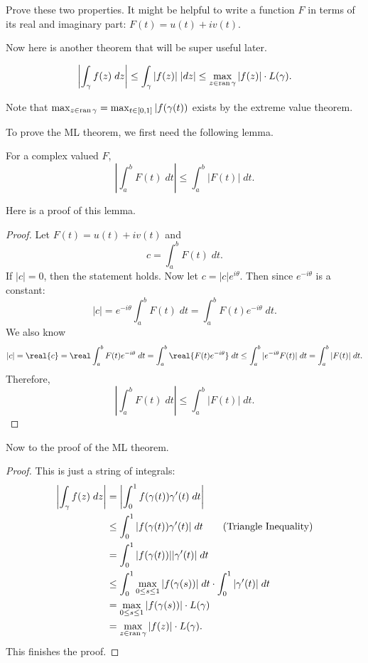 \documentclass[notes]{subfile}
\begin{document}
\begin{exercise}
    Prove these two properties.
    It might be helpful to write a function $F$ in terms of
    its real and imaginary part: $F(t) = u(t) + iv(t)$.
\end{exercise}

Now here is another theorem that will be super useful later.
\begin{theorem}[ML Theorem]
    \[ \left| \int_{\gamma} f(z) \; dz \right| \le
        \int_{\gamma} |f(z)| \; |dz| \le
    \max_{z \in \operatorname{ran}{\gamma}} |f(z)| \cdot L(\gamma). \]
\end{theorem}

Note that $\max_{z \in \operatorname{ran}{\gamma}} = \max_{t \in [0,1]} |f(\gamma(t))$ exists by the extreme value theorem. 

To prove the ML theorem, we first need the following lemma.
\begin{lemma}
    For a complex valued $F$,
    \[ \left| \int_a^b F(t) \; dt \right| \le 
    \int_a^b |F(t)| \; dt. \]
\end{lemma}

Here is a proof of this lemma.
\begin{proof}
    Let $F(t) = u(t) + iv(t)$ and
    \[ c = \int_a^b F(t) \; dt. \]
    If $|c| = 0$, then the statement holds.
    Now let $c = |c| e^{i\theta}$.
    Then since $e^{-i\theta}$ is a constant:
    \[ |c| = e^{-i\theta} \int_a^b F(t) \; dt = \int_a^b 
    F(t)e^{-i\theta} \; dt. \]
    We also know
    \[ |c| = \real{c} = \real \int_a^b F(t)e^{-i\theta} \; dt
        = \int_a^b \real{F(t) e^{-i\theta}} \; dt
        \le \int_a^b |e^{-i\theta} F(t)| \; dt 
    = \int_a^b |F(t)| \; dt. \]
    Therefore,
    \[ \left| \int_a^b F(t) \; dt \right| \le 
    \int_a^b |F(t)| \; dt. \]

\end{proof}

Now to the proof of the ML theorem.
\begin{proof}
    This is just a string of integrals:
    \begin{align*}
        \left| \int_{\gamma} f(z) \; dz \right| &= 
        \left| \int_0^1 f(\gamma(t))\gamma'(t) \; dt \right| \\
        &\le \int_0^1 |f(\gamma(t))\gamma'(t)| \; dt 
        \tag{Triangle Inequality} \\
        &= \int_0^1 |f(\gamma(t))| |\gamma'(t)| \; dt \\
        &\le \int_0^1 \max_{0 \le s \le 1} |f(\gamma(s))| \; dt
        \cdot \int_0^1 |\gamma'(t)| \; dt \\
        &= \max_{0 \le s \le 1} |f(\gamma(s))| \cdot L(\gamma) \\
        &= \max_{z \in \operatorname{ran}{\gamma}} |f(z)| \cdot L(\gamma).
    \end{align*}
    This finishes the proof.
\end{proof}
\end{document}
